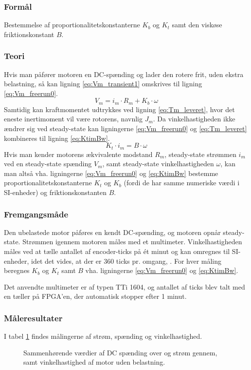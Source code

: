 \subsubsection{Formål}
Bestemmelse af proportionalitetskonstanterne \(K_b\) og \(K_t\) samt den viskøse friktionskonstant \(B\).

\subsubsection{Teori}
Hvis man påfører motoren en DC-spænding og lader den rotere frit, uden ekstra belastning,
så kan ligning \ref{eq:Vm_transient1} omskrives til ligning \ref{eq:Vm_freerun0}.
\begin{equation}
	V_m=i_m\cdot{R_m}+K_b\cdot\omega
	\label{eq:Vm_freerun0}
 \end{equation}
Samtidig kan kraftmomentet udtrykkes ved ligning \ref{eq:Tm_leveret}, hvor det eneste inertimoment vil være
rotorens, navnlig \(J_m\).
Da vinkelhastigheden ikke ændrer sig ved steady-state kan ligningerne \ref{eq:Vm_freerun0} og \ref{eq:Tm_leveret} kombineres
til ligning \ref{eq:KtimBw}.
\begin{equation}
	K_t\cdot{i_m}=B\cdot\omega
	\label{eq:KtimBw}
 \end{equation}
Hvis man kender motorens ækvivalente modstand \(R_m\), steady-state strømmen \(i_m\) ved en steady-state spænding \(V_m\),
samt steady-state vinkelhastigheden \(\omega\), kan man altså vha. ligningerne \ref{eq:Vm_freerun0} og \ref{eq:KtimBw} bestemme
proportionalitetskonstanterne \(K_t\) og \(K_b\) (fordi de har samme numeriske værdi i SI-enheder) og friktionskonstanten \(B\).
\subsubsection{Fremgangsmåde}
Den ubelastede motor påføres en kendt DC-spænding, og motoren opnår steady-state.
Strømmen igennem motoren måles med et multimeter.
Vinkelhastigheden måles ved at tælle antallet af encoder-ticks på ét minut og kan omregnes til SI-enheder, 
idet det vides, at der er 360 ticks pr. omgang, \citep{emgmotor}.
For hver måling beregnes \(K_b\) og \(K_t\) samt \(B\) vha. ligningerne \ref{eq:Vm_freerun0} og \ref{eq:KtimBw}.

Det anvendte multimeter er af typen TTi 1604,
og antallet af ticks blev talt med en tæller på FPGA'en, der automatisk stopper efter 1 minut.
\subsubsection{Måleresultater}
I tabel \ref{tb:steadystatenoload} findes målingerne af strøm, spænding og vinkelhastighed.
\begin{figure}[th!]
	\centering
	
	\captionsetup{type=table}
	\caption[Steady-state spænding, strøm og vinkelhastighed uden belastning]
			{Sammenhørende værdier af DC spænding over og strøm gennem, samt vinkelhastighed af motor uden belastning.}
	\label{tb:steadystatenoload}
\end{figure}
